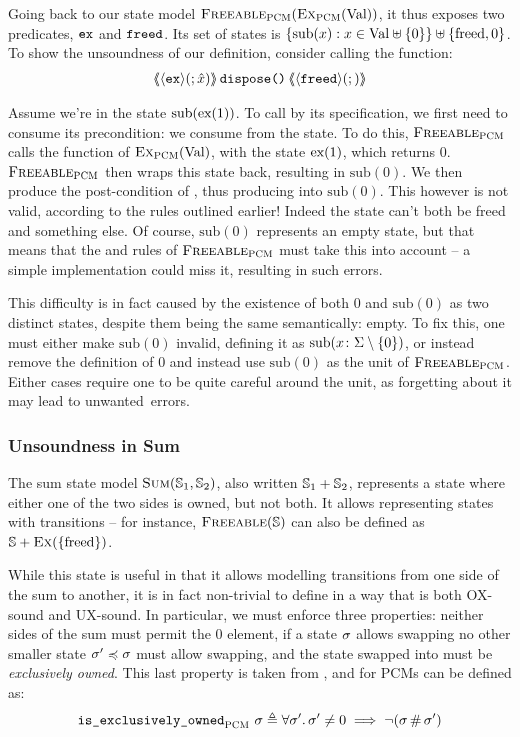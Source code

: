 Going back to our state model $\textsc{Freeable}_{\textsc{PCM}}(\textsc{Ex}_{\textsc{PCM}}(\text{Val}))$, it thus exposes two predicates, $\texttt{ex}$ and $\texttt{freed}$. Its set of states is $\{\text{sub}(x) : x \in \text{Val} \uplus \{ 0 \} \} \uplus \{ \text{freed}, 0 \}$. To show the unsoundness of our definition, consider calling the  function:
\begin{align*}
	\left<\mkern-5mu\left<\left<\texttt{ex}\right>\!(;\hat{x})\right>\mkern-5mu\right>\texttt{dispose()}\left<\mkern-5mu\left<\left<\texttt{freed}\right>\!(;)\right>\mkern-5mu\right>
\end{align*}

Assume we're in the state $\text{sub}(\text{ex}(1))$. To call  by its specification, we first need to consume its precondition: we consume  from the state. To do this, $\textsc{Freeable}_{\textsc{PCM}}$ calls the \consume{} function of $\textsc{Ex}_{\textsc{PCM}}(\text{Val})$, with the state $\text{ex}(1)$, which returns $0$. $\textsc{Freeable}_{\textsc{PCM}}$ then wraps this state back, resulting in $\text{sub}(0)$. We then produce the post-condition of , thus producing \corepred{\freedP}{}{} into $\text{sub}(0)$. This however is not valid, according to the rules outlined earlier! Indeed the state can't both be freed and something else. Of course, $\text{sub}(0)$ represents an empty state, but that means that the \consume{} and \produce{} rules of $\textsc{Freeable}_{\textsc{PCM}}$ must take this into account -- a simple implementation could miss it, resulting in such errors.

This difficulty is in fact caused by the existence of both $0$ and $\text{sub}(0)$ as two distinct states, despite them being the same semantically: empty. To fix this, one must either make $\text{sub}(0)$ invalid, defining it as $\text{sub}(x\colon \Sigma \setminus \{0\})$, or instead remove the definition of $0$ and instead use $\text{sub}(0)$ as the unit of $\textsc{Freeable}_{\textsc{PCM}}$. Either cases require one to be quite careful around the unit, as forgetting about it may lead to unwanted~errors.

\subsubsection{Unsoundness in Sum}\label{sec:unsoundness-in-sum}

The sum state model $\textsc{Sum}(\mathbb S_1, \mathbb S_2)$, also written $\mathbb S_1 + \mathbb S_2$, represents a state where either one of the two sides is owned, but not both. It allows representing states with transitions -- for instance, $\textsc{Freeable}(\mathbb S)$ can also be defined as $\mathbb S + \textsc{Ex}(\{\text{freed}\})$.

While this state is useful in that it allows modelling transitions from one side of the sum to another, it is in fact non-trivial to define in a way that is both OX-sound and UX-sound. In particular, we must enforce three properties: neither sides of the sum must permit the $0$ element, if a state $\sigma$ allows swapping no other smaller state $\sigma'\preccurlyeq\sigma$ must allow swapping, and the state swapped into must be \emph{exclusively owned}. This last property is taken from \cite{iris}, and for PCMs can be defined as: \begin{align*}
	\texttt{is\_exclusively\_owned}_{\textsc{PCM}}~\sigma \triangleq \forall \sigma'\ldotp \sigma'\neq 0\implies \neg(\sigma\operatorname{\#}\sigma')
\end{align*}

